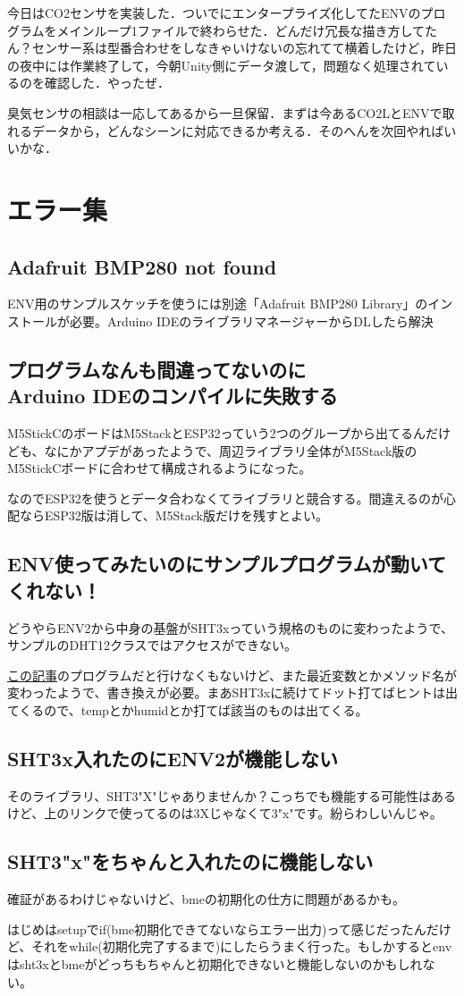 \documentclass[fleqn,twocolumn]{mynote}
\begin{document}
今日はCO2センサを実装した．ついでにエンタープライズ化してたENVのプログラムをメインループ1ファイルで終わらせた．どんだけ冗長な描き方してたん？センサー系は型番合わせをしなきゃいけないの忘れてて横着したけど，昨日の夜中には作業終了して，今朝Unity側にデータ渡して，問題なく処理されているのを確認した．やったぜ．

臭気センサの相談は一応してあるから一旦保留．まずは今あるCO2LとENVで取れるデータから，どんなシーンに対応できるか考える．そのへんを次回やればいいかな．

\section*{エラー集}
\subsection*{Adafruit BMP280 not found}
ENV用のサンプルスケッチを使うには別途「Adafruit BMP280 Library」のインストールが必要。Arduino IDEのライブラリマネージャーからDLしたら解決

\subsection*{プログラムなんも間違ってないのに\\Arduino IDEのコンパイルに失敗する}
M5StickCのボードはM5StackとESP32っていう2つのグループから出てるんだけども、なにかアプデがあったようで、周辺ライブラリ全体がM5Stack版のM5StickCボードに合わせて構成されるようになった。

なのでESP32を使うとデータ合わなくてライブラリと競合する。間違えるのが心配ならESP32版は消して、M5Stack版だけを残すとよい。

\subsection*{ENV使ってみたいのにサンプルプログラムが動いてくれない！}
どうやらENV2から中身の基盤がSHT3xっていう規格のものに変わったようで、サンプルのDHT12クラスではアクセスができない。

\href{https://qiita.com/visyeii/items/e28f8500f43166710664}{この記事}のプログラムだと行けなくもないけど、また最近変数とかメソッド名が変わったようで、書き換えが必要。まあSHT3xに続けてドット打てばヒントは出てくるので、tempとかhumidとか打てば該当のものは出てくる。

\subsection*{SHT3x入れたのにENV2が機能しない}
そのライブラリ、SHT3"X"じゃありませんか？こっちでも機能する可能性はあるけど、上のリンクで使ってるのは3Xじゃなくて3"x"です。紛らわしいんじゃ。

\subsection*{SHT3"x"をちゃんと入れたのに機能しない}
確証があるわけじゃないけど、bmeの初期化の仕方に問題があるかも。

はじめはsetupでif(bme初期化できてないならエラー出力)って感じだったんだけど、それをwhile(初期化完了するまで)にしたらうまく行った。もしかするとenvはsht3xとbmeがどっちもちゃんと初期化できないと機能しないのかもしれない。



\end{document}
